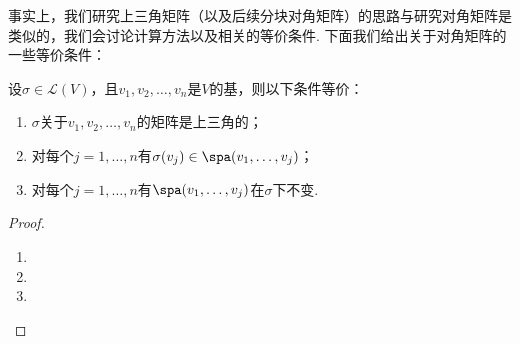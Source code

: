 \begin{solution}

\end{solution}

事实上，我们研究上三角矩阵（以及后续分块对角矩阵）的思路与研究对角矩阵是类似的，我们会讨论计算方法以及相关的等价条件. 下面我们给出关于对角矩阵的一些等价条件：
\begin{theorem}\label{thm:17:上三角矩阵等价条件}
    设$\sigma\in \mathcal{L}(V)$，且$v_1,v_2,\ldots,v_n$是$V$的基，则以下条件等价：
    \begin{enumerate}
        \item $\sigma$关于$v_1,v_2,\ldots,v_n$的矩阵是上三角的；

        \item 对每个$j=1,\ldots,n$有$\sigma(v_j)\in\spa(v_1,\ldots,v_j)$；

        \item 对每个$j=1,\ldots,n$有$\spa(v_1,\ldots,v_j)$在$\sigma$下不变.
    \end{enumerate}
\end{theorem}

\begin{proof}
    \begin{enumerate}
        \item

        \item

        \item
    \end{enumerate}
\end{proof}

